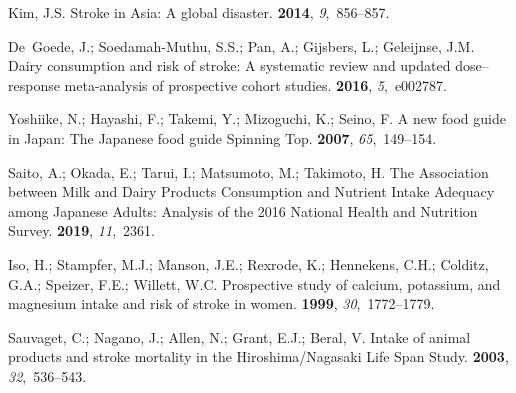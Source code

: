 \documentclass[nutrients,article,accept,moreauthors,pdftex]{Definitions/mdpi}
\begin{document}


\begin{thebibliography}{999}

Kim, J.S.
\newblock Stroke in Asia: A global disaster.
 {\bf 2014}, {\em 9},~856--857.

De~Goede, J.; Soedamah-Muthu, S.S.; Pan, A.; Gijsbers, L.; Geleijnse, J.M.
\newblock Dairy consumption and risk of stroke: A systematic review and updated
  dose--response meta-analysis of prospective cohort studies.
 {\bf 2016}, {\em
  5},~e002787.

Yoshiike, N.; Hayashi, F.; Takemi, Y.; Mizoguchi, K.; Seino, F.
\newblock A new food guide in Japan: The Japanese food guide Spinning Top.
 {\bf 2007}, {\em 65},~149--154.

Saito, A.; Okada, E.; Tarui, I.; Matsumoto, M.; Takimoto, H.
\newblock The Association between Milk and Dairy Products Consumption and
  Nutrient Intake Adequacy among Japanese Adults: Analysis of the 2016 National
  Health and Nutrition Survey.
 {\bf 2019}, {\em 11},~2361.

Iso, H.; Stampfer, M.J.; Manson, J.E.; Rexrode, K.; Hennekens, C.H.; Colditz,
  G.A.; Speizer, F.E.; Willett, W.C.
\newblock Prospective study of calcium, potassium, and magnesium intake and
  risk of stroke in women.
 {\bf 1999}, {\em 30},~1772--1779.

Sauvaget, C.; Nagano, J.; Allen, N.; Grant, E.J.; Beral, V.
\newblock Intake of animal products and stroke mortality in the
  Hiroshima/Nagasaki Life Span Study.
 {\bf 2003}, {\em
  32},~536--543.


\end{thebibliography}
\end{document}
